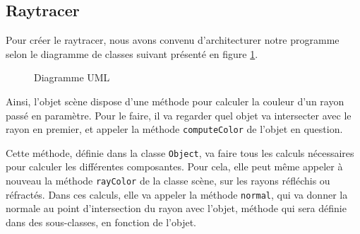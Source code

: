 \documentclass[a4paper]{article}
\begin{document}
  \subsection{Raytracer}
    Pour créer le raytracer, nous avons convenu d'architecturer notre programme
    selon le diagramme de classes suivant présenté en figure \ref{fig:uml}.

    \begin{landscape}
      \thispagestyle{empty}
      \begin{figure}[p]
        \caption{Diagramme UML\label{fig:uml}}
      \end{figure}
    \end{landscape}
    \restoregeometry

    Ainsi, l'objet scène dispose d'une méthode pour calculer la couleur d'un
    rayon passé en paramètre.
    Pour le faire, il va regarder quel objet va intersecter avec le rayon en
    premier, et appeler la méthode \verb+computeColor+ de l'objet en question.

    Cette méthode, définie dans la classe \verb+Object+, va faire tous les
    calculs nécessaires pour calculer les différentes composantes. Pour cela,
    elle peut même appeler à nouveau la méthode \verb+rayColor+ de la classe
    scène, sur les rayons réfléchis ou réfractés.
    Dans ces calculs, elle va appeler la méthode \verb+normal+, qui va donner
    la normale au point d'intersection du rayon avec l'objet, méthode qui sera
    définie dans des sous-classes, en fonction de l'objet.
\end{document}
